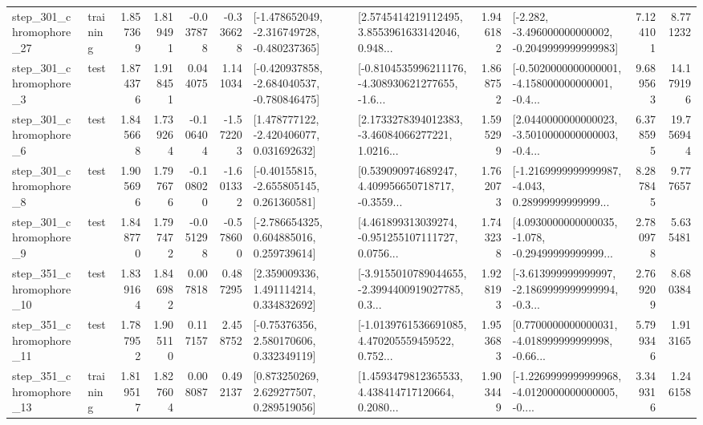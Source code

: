\begin{tabular}{llrrrrllrlrr}
  step\_301\_chromophore\_27 &  training &      1.857369 &    1.819491 &     -0.037878 & -0.336628 &  [-1.478652049, -2.316749728, -0.480237365] &  [2.5745414219112495, 3.8553961633142046, 0.948... &       1.946182 &  [-2.282, -3.496000000000002, -0.2049999999999983] &            7.124101 &          8.771232 \\
   step\_301\_chromophore\_3 &      test &      1.874376 &    1.918451 &      0.044075 &  1.141034 &  [-0.420937858, -2.684040537, -0.780846475] &  [-0.8104535996211176, -4.308930621277655, -1.6... &       1.868752 &  [-0.5020000000000001, -4.158000000000001, -0.4... &            9.689563 &         14.179196 \\
   step\_301\_chromophore\_6 &      test &      1.845668 &    1.739264 &     -0.106404 & -1.572203 &    [1.478777122, -2.420406077, 0.031692632] &  [2.1733278394012383, -3.46084066277221, 1.0216... &       1.595299 &  [2.0440000000000023, -3.5010000000000003, -0.4... &            6.378595 &         19.756944 \\
   step\_301\_chromophore\_8 &      test &      1.905696 &    1.797676 &     -0.108020 & -1.601332 &    [-0.40155815, -2.655805145, 0.261360581] &  [0.539090974689247, 4.409956650718717, -0.3559... &       1.762073 &  [-1.2169999999999987, -4.043, 0.28999999999999... &            8.287845 &          9.777657 \\
   step\_301\_chromophore\_9 &      test &      1.848770 &    1.797472 &     -0.051298 & -0.578600 &    [-2.786654325, 0.604885016, 0.259739614] &  [4.461899313039274, -0.951255107111727, 0.0756... &       1.743238 &  [4.0930000000000035, -1.078, -0.29499999999999... &            2.780978 &          5.635481 \\
  step\_351\_chromophore\_10 &      test &      1.839164 &    1.846982 &      0.007818 &  0.487295 &     [2.359009336, 1.491114214, 0.334832692] &  [-3.9155010789044655, -2.3994400919027785, 0.3... &       1.928193 &  [-3.613999999999997, -2.1869999999999994, -0.3... &            2.769209 &          8.680384 \\
  step\_351\_chromophore\_11 &      test &      1.787952 &    1.905110 &      0.117157 &  2.458752 &     [-0.75376356, 2.580170606, 0.332349119] &  [-1.0139761536691085, 4.470205559459522, 0.752... &       1.953683 &  [0.7700000000000031, -4.018999999999998, -0.66... &            5.799346 &          1.913165 \\
  step\_351\_chromophore\_13 &  training &      1.819517 &    1.827604 &      0.008087 &  0.492137 &     [0.873250269, 2.629277507, 0.289519056] &  [1.4593479812365533, 4.438414717120664, 0.2080... &       1.903449 &  [-1.2269999999999968, -4.0120000000000005, -0.... &            3.349316 &          1.246158 \\

\end{tabular}
